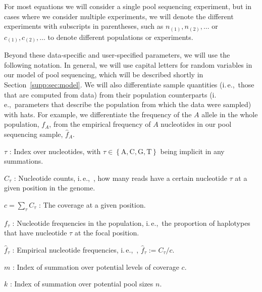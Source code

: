 \documentclass[a4paper,fontsize=9pt,DIV=14]{scrartcl}
\newcommand\secref[1]{Section~\ref{#1}}
\newcommand{\samplesize}{n}
\newcommand{\coverage}{c}
\newcommand{\empfreq}{\widehat{f}}
\newcommand{\ie}{i.\,e.,~}
\begin{document}
For most equations we will consider a single pool sequencing experiment, but in cases where we consider multiple experiments, we will denote the different experiments with subscripts in parentheses, such as $\samplesize_{(1)}, \samplesize_{(2)},\ldots$ or $\coverage_{(1)}, \coverage_{(2)}, \ldots$ to denote different populations or experiments.

Beyond these data-specific and user-specified parameters, we will use the following notation.  In general, we will use capital letters for random variables in our model of pool sequencing, which will be described shortly in \secref{supp:sec:model}.  We will also differentiate sample quantities (\ie those that are computed from data) from their population counterparts (\ie parameters that describe the population from which the data were sampled) with hats.  For example, we differentiate the frequency of the $A$ allele in the whole population, $f_A$, from the empirical frequency of $A$ nucleotides in our pool sequencing sample, $\empfreq_A$.

$\tau$ :
Index over nucleotides, with $\tau \in \left\{ \text{A}, \text{C}, \text{G}, \text{T} \right\}$ being implicit in any summations.

$C_\tau$ :
Nucleotide counts, \ie, how many reads have a certain nucleotide $\tau$ at a given position in the genome.

$\coverage = \sum_\tau C_\tau$ : The coverage at a given position.

$f_\tau$ :
Nucleotide frequencies in the population, \ie the proportion of haplotypes that have nucleotide $\tau$ at the focal position.

$\empfreq_\tau$ :
Empirical nucleotide frequencies, \ie, $\empfreq_\tau := C_\tau / \coverage$. %


$m$ :
Index of summation over potential levels of coverage $\coverage$.

$k$ :
Index of summation over potential pool sizes $\samplesize$.



\end{document}
